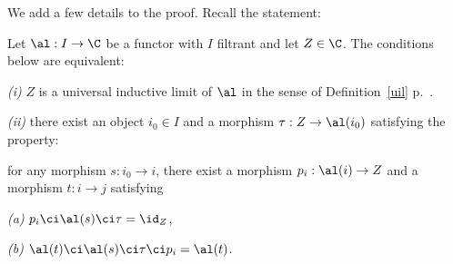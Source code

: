 \documentclass[12pt]{article}
\theoremstyle{remark}
\theoremstyle{definition}
\begin{document}


We add a few details to the proof. Recall the statement: 
\begin{prop}[Proposition 6.2.1 p.~138] 
Let $\al:I\to \C$ be a functor with $I$ filtrant and let $Z\in\C$. The conditions below are equivalent:

\nn\emph{(i)} $Z$ is a universal inductive limit of $\al$ in the sense of Definition~\ref{uil} p.~. %

\nn\emph{(ii)} there exist an object $i_0\in I$ and a morphism $\tau:Z\to\al(i_0)$ satisfying the property:

\nn for any morphism $s:i_0\to i$, there exist a morphism $p_i:\al(i)\to Z$ and a morphism $t:i\to j$ satisfying 

\nn\emph{(a)} $p_i\ci\al(s)\ci\tau=\id_Z$,

\nn\emph{(b)} $\al(t)\ci\al(s)\ci\tau\ci p_i=\al(t)$.
\end{prop}
\end{document}
